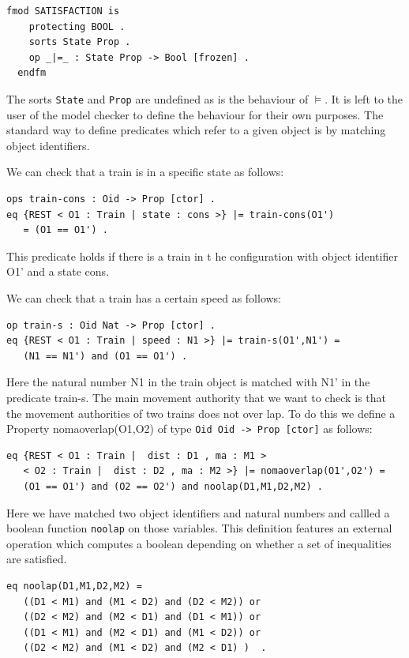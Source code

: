 \begin{lstlisting}[caption =  The Maude Satisfaction module, label =code:satsifaction ]
  fmod SATISFACTION is  
    protecting BOOL .  
    sorts State Prop .  
    op _|=_ : State Prop -> Bool [frozen] .  
  endfm
\end{lstlisting}
\medskip
The sorts \texttt{State} and \texttt{Prop} are undefined as is the behaviour of $\models$. It is left to the user of the model checker to define the behaviour for their own purposes. The standard way to define predicates which refer to a given object is by matching object identifiers.

We can check that a train is in a specific state as follows:
\begin{lstlisting}[caption = The constant speed property]
ops train-cons : Oid -> Prop [ctor] .
eq {REST < O1 : Train | state : cons >} |= train-cons(O1') 
   = (O1 == O1') . 
\end{lstlisting}
This predicate holds if there is a train in t he configuration with object identifier O1' and a state cons. 

We can check that a train has a certain speed as follows:
\begin{lstlisting}[caption = The speed property]
op train-s : Oid Nat -> Prop [ctor] .
eq {REST < O1 : Train | speed : N1 >} |= train-s(O1',N1') = 
   (N1 == N1') and (O1 == O1') .
\end{lstlisting}

Here the natural number N1 in the train object is matched with N1' in the predicate train-s.
The main movement authority that we want to check is that the movement authorities of two trains does not over lap.
To do this we define a Property nomaoverlap(O1,O2) of type \texttt{Oid Oid -> Prop [ctor]} as follows: 

\begin{lstlisting}
eq {REST < O1 : Train |  dist : D1 , ma : M1 > 
   < O2 : Train |  dist : D2 , ma : M2 >} |= nomaoverlap(O1',O2') = 
   (O1 == O1') and (O2 == O2') and noolap(D1,M1,D2,M2) .
\end{lstlisting}
Here we have matched two object identifiers and natural numbers and callled a boolean function \texttt{noolap} on those variables. This definition features an external operation which computes a boolean depending on whether a set of inequalities are satisfied. 

\begin{lstlisting}[caption = The no overlap operation]
eq noolap(D1,M1,D2,M2) = 
   ((D1 < M1) and (M1 < D2) and (D2 < M2)) or 
   ((D2 < M2) and (M2 < D1) and (D1 < M1)) or 
   ((D1 < M1) and (M2 < D1) and (M1 < D2)) or 
   ((D2 < M2) and (M1 < D2) and (M2 < D1) )  .  
\end{lstlisting}

